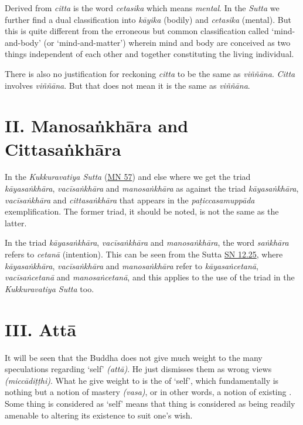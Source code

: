 Derived from \emph{citta} is the word \emph{cetasika} which means \emph{mental}. In the \emph{Sutta} we further find a dual classification into \emph{kāyika} (bodily) and \emph{cetasika} (mental). But this is quite different from the erroneous but common classification called `mind-and-body' (or `mind-and-matter') wherein mind and body are conceived as two things independent of each other and together constituting the living individual.

There is also no justification for reckoning \emph{citta} to be the same as \emph{viññāna}. \emph{Citta} involves \emph{viññāna}. But that does not mean it is the same as \emph{viññāna}.

\hypertarget{_ii_manosaux1e45khux101ra_and_cittasaux1e45khux101ra}{%
\section{II. Manosaṅkhāra and Cittasaṅkhāra}\label{_ii_manosaux1e45khux101ra_and_cittasaux1e45khux101ra}}

In the \emph{Kukkuravatiya Sutta} (\href{https://suttacentral.net/mn57/en/bodhi}{MN 57}) and else where we get the triad \emph{kāyasaṅkhāra}, \emph{vacīsaṅkhāra} and \emph{manosaṅkhāra} as against the triad \emph{kāyasaṅkhāra}, \emph{vacīsaṅkhāra} and \emph{cittasaṅkhāra} that appears in the \emph{paṭiccasamuppāda} exemplification. The former triad, it should be noted, is not the same as the latter.

In the triad \emph{kāyasaṅkhāra}, \emph{vacīsaṅkhāra} and \emph{manosaṅkhāra}, the word \emph{saṅkhāra} refers to \emph{cetanā} (intention). This can be seen from the Sutta \href{https://suttacentral.net/sn12.25/en/bodhi}{SN 12.25}, where \emph{kāyasaṅkhāra}, \emph{vacīsaṅkhāra} and \emph{manosaṅkhāra} refer to \emph{kāyasaṅcetanā}, \emph{vacīsaṅcetanā} and \emph{manosaṅcetanā}, and this applies to the use of the triad in the \emph{Kukkuravatiya Sutta} too.

\hypertarget{_iii_attux101}{%
\section{III. Attā}\label{_iii_attux101}}

It will be seen that the Buddha does not give much weight to the many speculations regarding `self' \emph{(attā)}. He just dismisses them as wrong views \emph{(miccādiṭṭhi)}. What he  give weight to is the  of `self', which fundamentally is nothing but a notion of mastery \emph{(vasa)}, or in other words, a notion of existing . Some thing is considered as `self' means that thing is considered as being readily amenable to altering its existence to suit one's wish.

